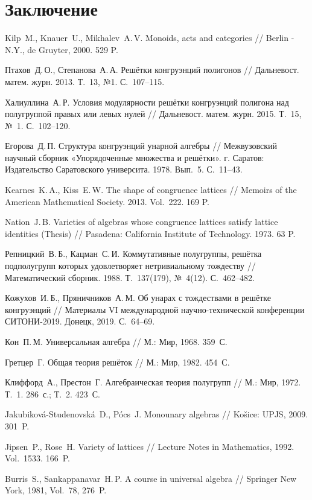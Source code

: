 \documentclass[11pt,twoside,final
]{article}
\begin{document}
\section{Заключение}

\begin{thebibliography}{99}
	
	Kilp~M., Knauer~U., Mikhalev~A.\,V. Monoids, acts and categories // Berlin - N.Y., de Gruyter, 2000. 529 P.
	
	Птахов~Д.\,О., Степанова~А.\,А. Решётки конгруэнций полигонов // Дальневост. матем. журн. 2013. Т.~13, №1. С.~107--115.
	
	Халиуллина~А.\,Р. Условия модулярности решётки конгруэнций полигона над полугруппой правых или левых нулей // Дальневост. матем. журн. 2015. Т.~15, №~1. С.~102--120.
	
	Егорова~Д.\,П. Структура конгруэнций унарной алгебры // Межвузовский научный сборник «Упорядоченные множества и решётки». г. Саратов: Издательство Саратовского университа. 1978. Вып.~5. С.~11--43.
	
	Kearnes~K.\,A., Kiss~E.\,W. The shape of congruence lattices // Memoirs of the American Mathematical Society. 2013. Vol.~222. 169 P.
	
	Nation~J.\,B. Varieties of algebras whose congruence lattices satisfy lattice identities (Thesis) // Pasadena: California Institute of Technology. 1973. 63 P.
	
	Репницкий~В.\,Б., Кацман~С.\,И. Коммутативные полугруппы, решётка подполугрупп которых удовлетворяет нетривиальному тождеству // Математический сборник. 1988. Т.~137(179), №~4(12). С.~462--482.
	
	Кожухов~И.\,Б., Пряничников~А.\,М. Об унарах с тождествами в решётке конгруэнций // Материалы VI международной научно-технической конференции СИТОНИ-2019. Донецк, 2019. С.~64--69.
	
	Кон~П.\,М. Универсальная алгебра // М.: Мир, 1968. 359~С.
	
	Гретцер~Г. Общая теория решёток // М.: Мир, 1982. 454~С.
	
	Клиффорд~А., Престон~Г. Алгебраическая теория полугрупп // М.: Мир, 1972. Т.~1. 286~с.; Т.~2. 423~С.
	
	Jakubiková-Studenovská~D., Pócs~J. Monounary algebras // Košice: UPJS, 2009. 301~P.
	
	Jipsen~P., Rose~H. Variety of lattices // Lecture Notes in Mathematics, 1992. Vol.~1533. 166~P.
	
	Burris~S., Sankappanavar~H.\,P. A course in universal algebra // Springer New York, 1981, Vol.~78, 276~P.
	
\end{thebibliography}
\end{document}
